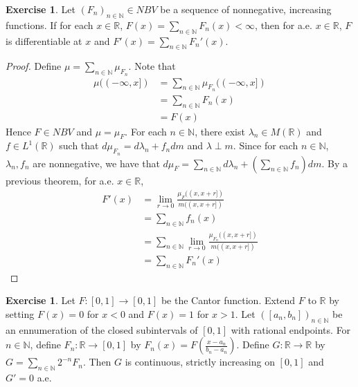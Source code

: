 \documentclass[12pt]{amsart}
\theoremstyle{definition}
\newtheorem{ex}[definition]{Exercise}
\newcommand{\lam}{\lambda}
\newcommand{\N}{\mathbb{N}}
\newcommand{\R}{\mathbb{R}}
\newcommand{\lex}[1]{\label{ex:#1}}
\begin{document}
	\begin{ex} \lex{00000} 
		Let $(F_n)_{n\in \N} \in NBV$ be a sequence of nonnegative, increasing functions. If for each $x \in \R$, $F(x)=\sum_{n \in \N}F_n(x)< \infty$, then for a.e. $x \in \R$, $F$ is differentiable at $x$ and $F'(x) = \sum_{n\in \N}F_n'(x)$. 
	\end{ex}
	
	\begin{proof}
		
		Define $\mu = \sum_{n \in \N}\mu_{F_n}$. Note that 
		\begin{align*}
			\mu((-\infty,x]) 
			&= \sum_{n \in \N}\mu_{F_n}((-\infty,x]) \\
			&= \sum_{n \in \N}F_n(x)\\
			&= F(x)
		\end{align*}
		Hence $F \in NBV$ and $\mu=\mu_F$. For each $n \in \N$, there exist $\lam_n \in M(\R)$ and $f \in L^1(\R)$ such that $d\mu_{F_n} = d\lam_n + f_ndm$ and $\lam \perp m$. Since for each $n \in \N$, $\lam_n, f_n$ are nonnegative, we have that $d\mu_F =  \sum_{n \in \N} d\lam_n + (\sum_{n \in \N}f_n)dm$. By a previous theorem, for a.e. $x \in \R$, 
		\begin{align*}
			F'(x) 
			&= \lim_{r \rightarrow 0}\frac{\mu_F((x,x+r])}{m((x,x+r])} \\
			&= \sum_{n \in \N}f_n(x)\\
			&= \sum_{n \in \N}\lim_{r \rightarrow 0}\frac{\mu_{F_n}((x,x+r])}{m((x,x+r])} \\
			&= \sum_{n \in \N}F_n'(x)
		\end{align*}
	\end{proof}
	
	\begin{ex} \lex{00000} 
		Let $F:[0,1]\rightarrow [0, 1]$ be the Cantor function. Extend $F$ to $\R$ by setting $F(x) = 0$ for $x<0$ and $F(x)=1$ for $x>1$. Let $([a_n,b_n])_{n \in \N}$ be an ennumeration of the closed subintervals of $[0,1]$ with rational endpoints. For $n \in \N$, define $F_n:\R \rightarrow [0,1]$ by $F_n(x) = F(\frac{x-a_n}{b_n-a_n})$. Define $G:\R \rightarrow \R$ by $G = \sum_{n \in \N}2^{-n}F_n$. Then $G$ is continuous, strictly increasing on $[0,1]$ and $G'=0$ a.e.
	\end{ex}
	
\end{document}

